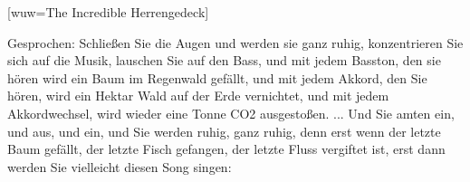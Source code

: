[wuw={The Incredible Herrengedeck}]

\markboth{\songtitle}{\songtitle}


\beginverse
Gesprochen:
Schließen Sie die Augen und werden sie ganz ruhig,
konzentrieren Sie sich auf die Musik,
lauschen Sie auf den Bass, 
und mit jedem Basston, den sie hören wird ein Baum im Regenwald gefällt,
und mit jedem Akkord, den Sie hören, wird ein Hektar Wald auf der Erde vernichtet,
und mit jedem Akkordwechsel, wird wieder eine Tonne CO2 ausgestoßen. 
...
Und Sie amten ein, und aus,
und ein, 
und Sie werden ruhig, ganz ruhig,
denn erst wenn der letzte Baum gefällt,
der letzte Fisch gefangen, 
der letzte Fluss vergiftet ist, 
erst dann werden Sie vielleicht diesen Song singen:
\endverse

